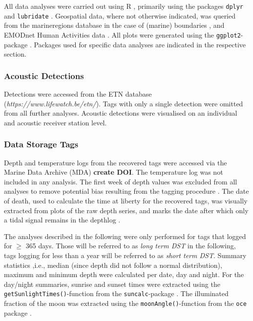 \documentclass[
  authoryear,
  review,
  3p]{elsarticle}
\begin{document}
All data analyses were carried out using R \citep{R_2022}, primarily
using the packages \texttt{dplyr} \citep{dplyr} and \texttt{lubridate}
\citep{lubridate}. Geospatial data, where not otherwise indicated, was
queried from the marineregions database \citep{claus_2014} in the case
of (marine) boundaries \citep[with the
\texttt{mregions2}-package,][]{mregions2}, and EMODnet Human Activities
\citep{solaun_2021} data \citep[with the
\texttt{EMODnetWFS}-package,][]{EMODnetWFS}. All plots were generated
using the \texttt{ggplot2}-package \citep{ggplot2}. Packages used for
specific data analyses are indicated in the respective section.

\hypertarget{acoustic-detections}{%
\subsubsection{Acoustic Detections}\label{acoustic-detections}}

Detections were accessed from the ETN database
(\emph{https://www.lifewatch.be/etn/}). Tags with only a single
detection were omitted from all further analyses. Acoustic detections
were visualised on an individual and acoustic receiver station level.

\hypertarget{sec-mm_dsts}{%
\subsubsection{Data Storage Tags}\label{sec-mm_dsts}}

Depth and temperature logs from the recovered tags were accessed via the
Marine Data Archive (MDA) \textbf{create DOI}. The temperature log was
not included in any analysis. The first week of depth values was
excluded from all analyses to remove potential bias resulting from the
tagging procedure \citep[as suggested by][]{flavio_2021}. The date of
death, used to calculate the time at liberty for the recovered tags, was
visually extracted from plots of the raw depth series, and marks the
date after which only a tidal signal remains in the depthlog
\citep[characterised by cyclically rising and falling depths within a
rough 2 m depth range,][]{kvale_2006}.

The analyses described in the following were only performed for tags
that logged for \(\geq\) 365 days. Those will be referred to as
\emph{long term DST} in the following, tags logging for less than a year
will be referred to as \emph{short term DST}. Summary statistics ,i.e.,
median (since depth did not follow a normal distribution), maximum and
minimum depth were calculated per date, day and night. For the day/night
summaries, sunrise and sunset times were extracted using the
\texttt{getSunlightTimes()}-function from the \texttt{suncalc}-package
\citep{suncalc}. The illuminated fraction of the moon was extracted
using the \texttt{moonAngle()}-function from the \texttt{oce} package
\citep{oce}.
\end{document}
